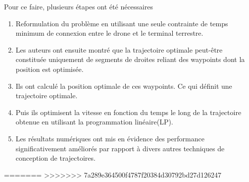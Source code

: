 \documentclass[utf8, a4paper]{beamer}
\begin{document}
\begin{frame} {}
 Pour ce faire, plusieurs étapes ont été nécessaires\pause

\begin{enumerate}
	\item Reformulation du problème en utilisant une seule contrainte
	de temps minimum de connexion entre le drone et le terminal terrestre.
	\pause
	
	\item Les auteurs ont ensuite montré que la trajectoire optimale
	peut-être constituée uniquement de segments de droites reliant des
	waypoints dont la position est optimisée.
	\pause
	\item Ils ont calculé la position optimale de ces waypoints.
	Ce qui définit une trajectoire optimale. 
	\pause  
	\item Puis ils optimisent la vitesse en fonction du temps le long de la trajectoire obtenue
	en utilisant la programmation linéaire(LP).
	\pause
	\item Les résultats numériques ont mis en évidence des performance significativement améliorés
	 par rapport à divers autres techniques de conception de trajectoires.

\end{enumerate}
\end{frame}

=======
>>>>>>> 7a289e364500f4787f20384d30792bd27d126247







\end{document}
